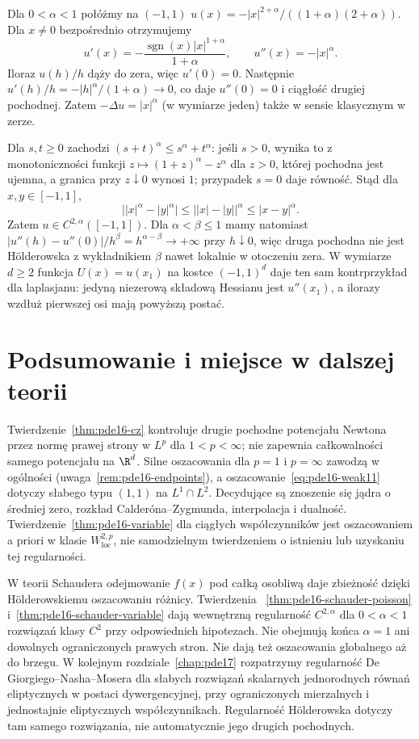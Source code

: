 \begin{kontrprzyklad}
Dla $0<\alpha<1$ połóżmy na $(-1,1)$
$u(x)=-|x|^{2+\alpha}/((1+\alpha)(2+\alpha))$.
Dla $x\ne0$ bezpośrednio otrzymujemy
\[
 u'(x)=-\frac{\operatorname{sgn}(x)|x|^{1+\alpha}}{1+\alpha},
 \qquad u''(x)=-|x|^\alpha.
\]
Iloraz $u(h)/h$ dąży do zera, więc $u'(0)=0$.
Następnie $u'(h)/h=-|h|^\alpha/(1+\alpha)\to0$,
co daje $u''(0)=0$ i ciągłość drugiej pochodnej.
Zatem $-\Delta u=|x|^\alpha$ (w wymiarze jeden)
także w sensie klasycznym w zerze.

Dla $s,t\ge0$ zachodzi $(s+t)^\alpha\le s^\alpha+t^\alpha$:
jeśli $s>0$, wynika to z monotoniczności funkcji
$z\mapsto (1+z)^\alpha-z^\alpha$ dla $z>0$,
której pochodna jest ujemna, a granica przy $z\downarrow0$
wynosi $1$; przypadek $s=0$ daje równość.
Stąd dla $x,y\in[-1,1]$,
\[
 \bigl||x|^\alpha-|y|^\alpha\bigr|
 \le\bigl||x|-|y|\bigr|^\alpha
 \le |x-y|^\alpha.
\]
Zatem $u\in C^{2,\alpha}([-1,1])$.
Dla $\alpha<\beta\le1$ mamy natomiast
$|u''(h)-u''(0)|/h^\beta=h^{\alpha-\beta}\to+\infty$
przy $h\downarrow0$, więc druga pochodna nie jest
Hölderowska z wykładnikiem $\beta$ nawet lokalnie
w otoczeniu zera. W wymiarze $d\ge2$ funkcja
$U(x)=u(x_1)$ na kostce $(-1,1)^d$ daje ten sam
kontrprzykład dla laplasjanu: jedyną niezerową
składową Hessianu jest $u''(x_1)$, a ilorazy
wzdłuż pierwszej osi mają powyższą postać.
\end{kontrprzyklad}

\section{Podsumowanie i miejsce w dalszej teorii}
Twierdzenie~\ref{thm:pde16-cz} kontroluje drugie
pochodne potencjału Newtona przez normę prawej
strony w $L^p$ dla $1<p<\infty$; nie zapewnia
całkowalności samego potencjału na $\R^d$.
Silne oszacowania dla $p=1$ i $p=\infty$ zawodzą
w ogólności (uwaga~\ref{rem:pde16-endpoints}),
a oszacowanie~\eqref{eq:pde16-weak11} dotyczy słabego
typu $(1,1)$ na $L^1\cap L^2$.
Decydujące są znoszenie się jądra o średniej zero,
rozkład Calderóna--Zygmunda, interpolacja i dualność.
Twierdzenie~\ref{thm:pde16-variable} dla ciągłych
współczynników jest oszacowaniem a priori
w klasie $W^{2,p}_{\mathrm{loc}}$, nie samodzielnym
twierdzeniem o istnieniu lub uzyskaniu tej regularności.

W teorii Schaudera odejmowanie $f(x)$ pod całką
osobliwą daje zbieżność dzięki Hölderowskiemu
oszacowaniu różnicy. Twierdzenia
~\ref{thm:pde16-schauder-poisson}
i~\ref{thm:pde16-schauder-variable} dają wewnętrzną
regularność $C^{2,\alpha}$ dla $0<\alpha<1$
rozwiązań klasy $C^2$ przy odpowiednich hipotezach.
Nie obejmują końca $\alpha=1$ ani dowolnych
ograniczonych prawych stron. Nie dają też
oszacowania globalnego aż do brzegu.
W kolejnym rozdziale~\ref{chap:pde17} rozpatrzymy
regularność De Giorgiego--Nasha--Mosera dla słabych
rozwiązań skalarnych jednorodnych równań eliptycznych
w postaci dywergencyjnej, przy ograniczonych mierzalnych
i jednostajnie eliptycznych współczynnikach.
Regularność Hölderowska dotyczy tam samego rozwiązania,
nie automatycznie jego drugich pochodnych.
